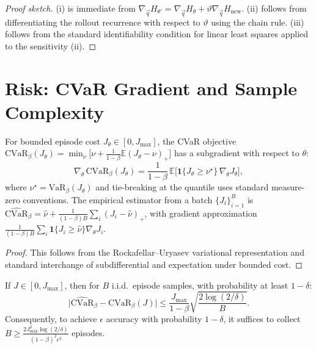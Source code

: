 \begin{proof}[Proof sketch]
(i) is immediate from $\nabla_{\vec{q}}H_{\theta'} =
\nabla_{\vec{q}}H_\theta + \vartheta\nabla_{\vec{q}}H_{\mathrm{new}}$.
(ii) follows from differentiating the rollout recurrence with respect
to $\vartheta$ using the chain rule.
(iii) follows from the standard identifiability condition for linear
least squares applied to the sensitivity (ii).
\end{proof}

\section{Risk: CVaR Gradient and Sample Complexity}
\label{app:risk}

\begin{theorem}
\label{app:thm:cvar_gradient}
For bounded episode cost $J_\theta\in[0,J_{\max}]$, the CVaR objective
$\mathrm{CVaR}_\beta(J_\theta) = \min_\nu
\bigl[\nu + \tfrac{1}{1-\beta}\mathbb{E}(J_\theta-\nu)_+\bigr]$
has a subgradient with respect to $\theta$:
\[
  \nabla_\theta\,\mathrm{CVaR}_\beta(J_\theta)
  = \frac{1}{1-\beta}\,\mathbb{E}\!\bigl[
    \mathbf{1}\{J_\theta\geq\nu^\star\}\,\nabla_\theta J_\theta
  \bigr],
\]
where $\nu^\star = \mathrm{VaR}_\beta(J_\theta)$ and tie-breaking at
the quantile uses standard measure-zero conventions.
The empirical estimator from a batch $\{J_i\}_{i=1}^B$ is
$\widehat{\mathrm{CVaR}}_\beta = \hat\nu
+ \tfrac{1}{(1-\beta)B}\sum_i(J_i-\hat\nu)_+$,
with gradient approximation
$\frac{1}{(1-\beta)B}\sum_i\mathbf{1}\{J_i\geq\hat\nu\}\nabla_\theta J_i$.
\end{theorem}

\begin{proof}
This follows from the Rockafellar--Uryasev variational representation
\citep{rockafellar2002cvar} and standard interchange of subdifferential
and expectation under bounded cost.
\end{proof}

\begin{lemma}
\label{app:lem:cvar_concentration}
If $J\in[0,J_{\max}]$, then for $B$ i.i.d.\ episode samples, with
probability at least $1-\delta$:
\[
  \bigl|\widehat{\mathrm{CVaR}}_\beta - \mathrm{CVaR}_\beta(J)\bigr|
  \leq
  \frac{J_{\max}}{1-\beta}
  \sqrt{\frac{2\log(2/\delta)}{B}}.
\]
Consequently, to achieve $\epsilon$ accuracy with probability $1-\delta$,
it suffices to collect
$B\geq \frac{2J_{\max}^2\log(2/\delta)}{(1-\beta)^2\epsilon^2}$ episodes.
\end{lemma}

